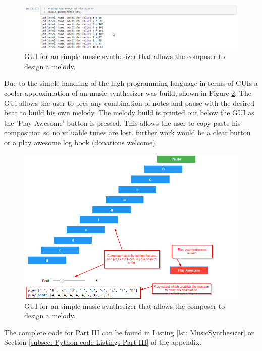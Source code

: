 \begin{figure}[H]
	\centering
	\includegraphics[width=1\textwidth]{01_images/p3_gamut_print}
	\caption{GUI for an simple music synthesizer that allows the composer to design a melody.}
	\label{fig: p3_gamut_print}
\end{figure}
\newpage
Due to the simple handling of the high programming language in terms of GUIs a cooler approximation of an music synthesizer was build, shown in Figure \ref{fig: part3_gui}. The GUi allows the user to pres any combination of notes and pause with the desired beat to build his own melody. The melody build is printed out below the GUI as the 'Play Awesome' button is pressed. This allows the user to copy paste his composition so no valuable tunes are lost. further work would be a clear button or a play awesome log book (donations welcome). 
\begin{figure}[H]
	\centering
	\includegraphics[width=1\textwidth]{01_images/p3_gui}
	\caption{GUI for an simple music synthesizer that allows the composer to design a melody.}
	\label{fig: part3_gui}
\end{figure}

The complete code for Part III can be found in Listing \ref{lst: MusicSynthesizer} or Section \ref{subsec: Python code Listings Part III} of the appendix.
\newpage

